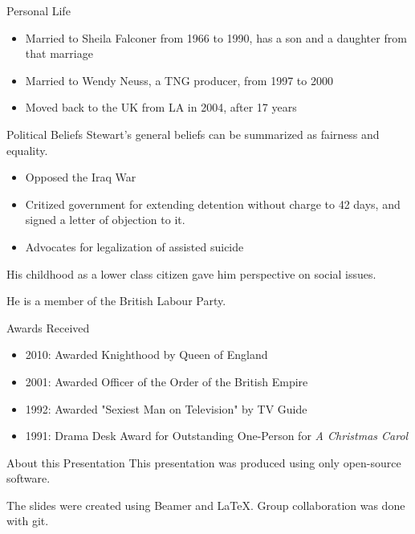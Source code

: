 \documentclass[xcolor=dvipsnames]{beamer}
\begin{document}
\begin{frame}{Personal Life}
  \begin{itemize}
    \item Married to Sheila Falconer from 1966 to 1990, has a son and a daughter
    from that marriage
    \item Married to Wendy Neuss, a TNG producer, from 1997 to 2000
    \item Moved back to the UK from LA in 2004, after 17 years
    \begin{qct}
    \end{qct}
  \end{itemize}
\end{frame}

\begin{frame}{Political Beliefs}
  Stewart's general beliefs can be summarized as fairness and equality.  
  \begin{itemize}
    \item Opposed the Iraq War
    \item Critized government for extending detention without charge to 42
    days, and signed a letter of objection to it.
    \item Advocates for legalization of assisted suicide
  \end{itemize}
  His childhood as a lower class citizen gave him perspective on social issues.

  He is a member of the British Labour Party.
\end{frame}

\begin{frame}{Awards Received}
  \begin{itemize}
    \item 2010: Awarded Knighthood by Queen of England
    \item 2001: Awarded Officer of the Order of the British Empire
      \begin{qct}
      \end{qct}
    \item 1992: Awarded "Sexiest Man on Television" by TV Guide
    \item 1991: Drama Desk Award for Outstanding One-Person for \emph{A
    Christmas Carol}
  \end{itemize}
\end{frame}

\begin{frame}{About this Presentation}
  This presentation was produced using only open-source software.

  The slides were created using Beamer and LaTeX.
  Group collaboration was done with git.
\end{frame}
\end{document}
